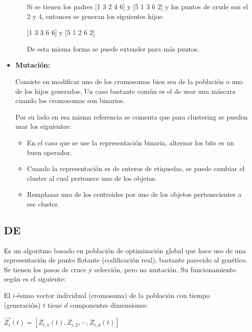 \begin{itemize}
\begin{itemize}
Si se tienen los padres [1 3 2 4 6]  y [5 1 3 6 2] y los puntos 
de crude son el 2 y 4, entonces se generan los siguientes hijos:

[1 3 3 6 6] y [5 1 2 6 2]

De esta misma forma se puede extender para m\'as puntos.

\end{itemize}

\item {\bf Mutaci\'on:}

Consiste en modificar uno de los cromosomas bien sea de la poblaci\'on
o uno de los hijos generados. Un caso bastante com\'un es el de usar una m\'ascara
cuando los cromosomas son binarios\cite{GePo2010}.

Por su lado en esa misma referencia se comenta que para clustering se pueden usar los siguientes:

\begin{itemize}

\item En el caso que se use la representaci\'on binaria, alternar los bits es un
buen operador.

\item Cuando la representaci\'on es de enteros de etiquedas, se puede cambiar
el cluster al cual pertenece uno de los objetos.

\item Remplazar uno de los centroides por uno de los objetos pertenecientes a ese
cluster.

\end{itemize}

\end{itemize}

\subsection{DE} \label{sect:metade}

Es un algoritmo basado en poblaci\'on de
optimizaci\'on global que hace uso de una representaci\'on de punto flotante
(codificaci\'on real), bastante parecido al gen\'etico. Se tienen los pasos de cruce 
y selecci\'on, pero no mutaci\'on. Su funcionamiento seg\'un \cite{SwAjAm2008}
es el siguiente:

El $i$-\'esimo vector individual (cromosoma)
de la poblaci\'on con tiempo (generaci\'on) $t$ tiene $d$ componentes
dimensiones:

\begin{center}
$ \overrightarrow{Z_i}(t) = [ Z_{i,1}(t), Z_{i,2}, \cdots, Z_{i,d}(t) ] $
\end{center}

